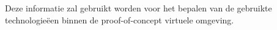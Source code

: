 Deze informatie zal gebruikt worden voor het bepalen van de gebruikte technologieëen binnen de proof-of-concept virtuele omgeving.

%



